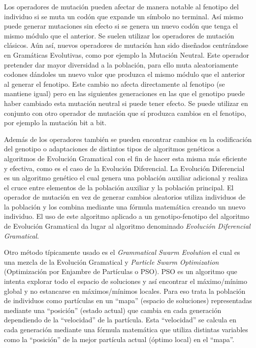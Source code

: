 Los operadores de mutación pueden afectar de manera notable al fenotipo del individuo si se muta un codón que expande un símbolo no terminal. Así mismo puede generar mutaciones sin efecto si se genera un nuevo codón que tenga el mismo módulo que el anterior. Se suelen utilizar los operadores de mutación clásicos. Aún así, nuevos operadores de mutación han sido diseñados centrándose en Gramáticas Evolutivas, como por ejemplo la Mutación Neutral\cite{Oesch2015}. Este operador pretender dar mayor diversidad a la población, para ello muta aleatoriamente codones dándoles un nuevo valor que produzca el mismo módulo que el anterior al generar el fenotipo. Este cambio no afecta directamente al fenotipo (se mantiene igual) pero en las siguientes generaciones en las que el genotipo puede haber cambiado esta mutación neutral si puede tener efecto. Se puede utilizar en conjunto con otro operador de mutación que sí produzca cambios en el fenotipo, por ejemplo la mutación bit a bit.

Además de los operadores también se pueden encontrar cambios en la codificación del genotipo\cite{lourencco2016unveiling} o adaptaciones de distintos tipos de algoritmos genéticos a algoritmos de Evolución Gramatical con el fin de hacer esta misma más eficiente y efectiva, como es el caso de la Evolución Diferencial. La Evolución Diferencial es un algoritmo genético el cual genera una población auxiliar adicional y realiza el cruce entre elementos de la población auxiliar y la población principal. El operador de mutación en vez de generar cambios aleatorios utiliza individuos de la población y los combina mediante una fórmula matemática creando un nuevo individuo. El uso de este algoritmo aplicado a un genotipo-fenotipo del algoritmo de Evolución Gramatical da lugar al algoritmo denominado \textit{Evolución Diferencial Gramatical}\cite{o2006grammatical}.

Otro método típicamente usado es el \textit{Grammatical Swarm Evolution} el cual es una mezcla de la Evolución Gramatical y \textit{Particle Swarm Optimization} (Optimización por Enjambre de Partículas o PSO)\cite{o2004grammatical}\cite{gomez2010particle}. PSO es un algoritmo que intenta explorar todo el espacio de soluciones y así encontrar el máximo/mínimo global y no estancarse en máximos/mínimos locales. Para eso trata la población de individuos como partículas en un ``mapa'' (espacio de soluciones) representadas mediante una ``posición'' (estado actual) que cambia en cada generación dependiendo de la ``velocidad''  de la partícula. Esta ``velocidad'' se calcula en cada generación mediante una fórmula matemática que utiliza distintas variables como la ``posición'' de la mejor partícula actual (óptimo local) en el ``mapa''.

